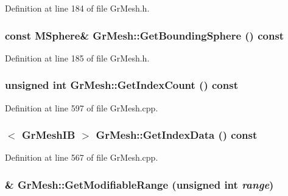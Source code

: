 Definition at line 184 of file GrMesh.h.\hypertarget{class_gr_mesh_dfd6378a686044cfd6d1599d7ee1b00c}{
\subsubsection[{GetBoundingSphere}]{\setlength{\rightskip}{0pt plus 5cm}const {\bf MSphere}\& GrMesh::GetBoundingSphere () const}}
\label{class_gr_mesh_dfd6378a686044cfd6d1599d7ee1b00c}




Definition at line 185 of file GrMesh.h.\hypertarget{class_gr_mesh_501d594b2d86fd5f5519477e88b94471}{
\subsubsection[{GetIndexCount}]{\setlength{\rightskip}{0pt plus 5cm}unsigned int GrMesh::GetIndexCount () const}}
\label{class_gr_mesh_501d594b2d86fd5f5519477e88b94471}




Definition at line 597 of file GrMesh.cpp.\hypertarget{class_gr_mesh_7ca8bc1bd71272eb87da9e4ada920735}{
\subsubsection[{GetIndexData}]{$<$ {\bf GrMeshIB} $>$ GrMesh::GetIndexData () const}}
\label{class_gr_mesh_7ca8bc1bd71272eb87da9e4ada920735}




Definition at line 567 of file GrMesh.cpp.\hypertarget{class_gr_mesh_fbbb46fe871032427705b2dc9e306b6d}{
\subsubsection[{GetModifiableRange}]{\& GrMesh::GetModifiableRange (unsigned int {\em range})}}
\label{class_gr_mesh_fbbb46fe871032427705b2dc9e306b6d}




